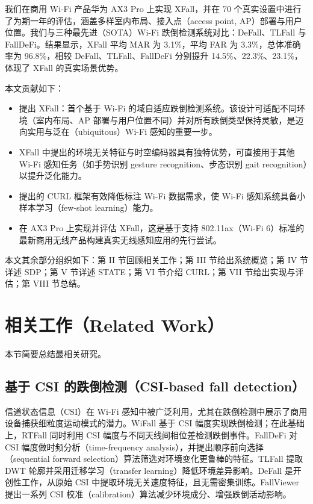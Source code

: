 \documentclass[UTF8,twocolumn]{ctexart}
\begin{document}
我们在商用 Wi\!-\!Fi 产品华为 AX3 Pro 上实现 XFall，并在 70 个真实设置中进行了为期一年的评估，涵盖多样室内布局、接入点（access point, AP）部署与用户位置。我们与三种最先进（SOTA）Wi\!-\!Fi 跌倒检测系统对比：DeFall\cite{ref16}、TLFall\cite{ref18} 与 FallDeFi\cite{ref15}。结果显示，XFall 平均 MAR 为 3.1\%，平均 FAR 为 3.3\%，总体准确率为 96.8\%，相较 DeFall、TLFall、FallDeFi 分别提升 14.5\%、22.3\%、23.1\%，体现了 XFall 的真实场景优势。

本文贡献如下：
\begin{itemize}
\item 提出 XFall：首个基于 Wi\!-\!Fi 的域自适应跌倒检测系统。该设计可适配不同环境（室内布局、AP 部署与用户位置不同）并对所有跌倒类型保持灵敏，是迈向实用与泛在（ubiquitous）Wi\!-\!Fi 感知的重要一步。
\item XFall 中提出的环境无关特征与时空编码器具有独特优势，可直接用于其他 Wi\!-\!Fi 感知任务（如手势识别 gesture recognition、步态识别 gait recognition）以提升泛化能力。
\item 提出的 CURL 框架有效降低标注 Wi\!-\!Fi 数据需求，使 Wi\!-\!Fi 感知系统具备小样本学习（few-shot learning）能力。
\item 在 AX3 Pro 上实现并评估 XFall，这是基于支持 802.11ax（Wi\!-\!Fi 6）标准的最新商用无线产品构建真实无线感知应用的先行尝试。
\end{itemize}

本文其余部分组织如下：第 II 节回顾相关工作；第 III 节给出系统概览；第 IV 节详述 SDP；第 V 节详述 STATE；第 VI 节介绍 CURL；第 VII 节给出实现与评估；第 VIII 节总结。

\section{相关工作（Related Work）}
本节简要总结最相关研究。

\subsection{基于 CSI 的跌倒检测（CSI-based fall detection）}
信道状态信息（CSI）在 Wi\!-\!Fi 感知中被广泛利用，尤其在跌倒检测中展示了商用设备捕获细粒度运动模式的潜力。WiFall\cite{ref14} 基于 CSI 幅度实现跌倒检测；在此基础上，RTFall\cite{ref17} 同时利用 CSI 幅度与不同天线间相位差检测跌倒事件。FallDeFi\cite{ref15} 对 CSI 幅度做时频分析（time-frequency analysis），并提出顺序前向选择（sequential forward selection）算法筛选对环境变化更鲁棒的特征。TLFall\cite{ref18} 提取 DWT 轮廓并采用迁移学习（transfer learning）降低环境差异影响。DeFall\cite{ref16} 是开创性工作，从原始 CSI 中提取环境无关速度特征，且无需密集训练。FallViewer\cite{ref22} 提出一系列 CSI 校准（calibration）算法减少环境成分、增强跌倒活动影响。
\end{document}
